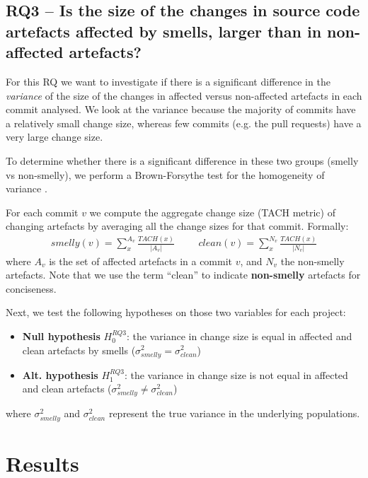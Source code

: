 \subsection{RQ3 -- Is the size of the changes in source code artefacts affected by smells, larger than in non-affected artefacts?}
For this RQ we want to investigate if there is a significant difference in the \emph{variance} of the size of the changes in affected versus non-affected artefacts in each commit analysed.
We look at the variance because the majority of commits have a relatively small change size, whereas few commits (e.g.  the pull requests) have a very large change size.

To determine whether there is a significant difference in these two groups (smelly vs non-smelly), we perform a Brown-Forsythe test for the homogeneity of variance \cite{Sheskin2007}.

For each commit $v$ we compute the aggregate change size (TACH metric) of changing artefacts by averaging all the change sizes for that commit.
Formally:
\begin{align*}
    smelly(v)  = \sum_{x}^{A_v} \frac{TACH(x)}{|A_v|} & & & clean(v) = \sum_{x}^{N_v} \frac{TACH(x)}{|N_v|}
\end{align*}
where $A_v$ is the set of affected artefacts in a commit $v$, and $N_v$ the non-smelly artefacts. Note that we use the term ``clean'' to indicate \textbf{non-smelly} artefacts for conciseness.

Next, we test the following hypotheses on those two variables for each project:
\begin{itemize}
    \item \textbf{Null hypothesis} $H^{RQ3}_0$: the variance in change size is equal in affected and clean artefacts by smells ($\sigma^2_{smelly} = \sigma^2_{clean}$)
    \item \textbf{Alt. hypothesis} $H^{RQ3}_1$: the variance in change size is not equal in affected and clean artefacts ($\sigma^2_{smelly} \ne \sigma^2_{clean}$)
\end{itemize}
where $\sigma^2_{smelly}$ and $\sigma^2_{clean}$ represent the true variance in the underlying populations.


\section{Results}\label{c5:sec:results}
